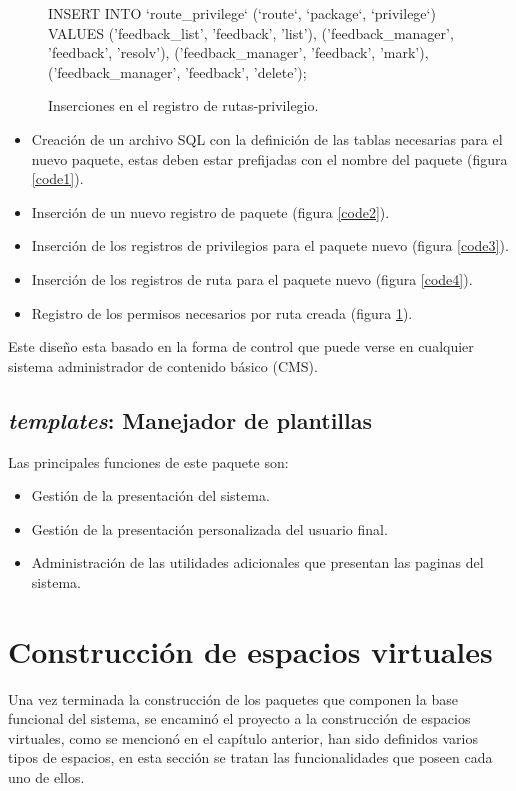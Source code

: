\begin{figure}
\centering
\begin{SQL}
INSERT INTO `route_privilege`
(`route`, `package`, `privilege`)
VALUES
('feedback_list',    'feedback', 'list'),
('feedback_manager', 'feedback', 'resolv'),
('feedback_manager', 'feedback', 'mark'),
('feedback_manager', 'feedback', 'delete');
\end{SQL}
\caption{Inserciones en el registro de rutas-privilegio.}
\label{code5}
\end{figure}

\begin{itemize}
\item Creación de un archivo SQL con la definición de las tablas necesarias para
el nuevo paquete, estas deben estar prefijadas con el nombre del paquete
(figura \ref{code1}).
\item Inserción de un nuevo registro de paquete (figura \ref{code2}).
\item Inserción de los registros de privilegios para el paquete nuevo
(figura \ref{code3}).
\item Inserción de los registros de ruta para el paquete nuevo
(figura \ref{code4}).
\item Registro de los permisos necesarios por ruta creada
(figura \ref{code5}).
\end{itemize}

Este diseño esta basado en la forma de control que puede verse en cualquier
sistema administrador de contenido básico (CMS).

\subsection{\emph{templates}: Manejador de plantillas}
Las principales funciones de este paquete son:

\begin{itemize}
\item Gestión de la presentación del sistema.
\item Gestión de la presentación personalizada del usuario final.
\item Administración de las utilidades adicionales que presentan las paginas
del sistema.
\end{itemize}

\section{Construcción de espacios virtuales}
Una vez terminada la construcción de los paquetes que componen la base funcional
del sistema, se encaminó el proyecto a la construcción de espacios virtuales,
como se mencionó en el capítulo anterior, han sido definidos varios tipos de
espacios, en esta sección se tratan las funcionalidades que poseen cada uno de
ellos.

